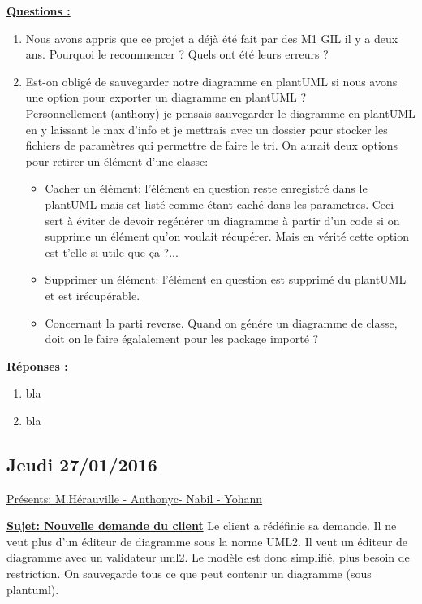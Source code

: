 \documentclass[a4paper,10pt]{article}
\begin{document}
\textbf{\underline{Questions :}}
\begin{enumerate}
  \item Nous avons appris que ce projet a déjà été fait par des M1 GIL il y a deux ans. Pourquoi le recommencer ? Quels ont été leurs erreurs ?
  \item Est-on obligé de sauvegarder notre diagramme en plantUML si nous avons une option pour exporter un diagramme en plantUML ?\\
	Personnellement (anthony) je pensais sauvegarder le diagramme en plantUML en y laissant le max d'info et je mettrais avec un dossier
	pour stocker les fichiers de paramètres qui permettre de faire le tri. On aurait deux options pour retirer un élément d'une classe:
	\begin{itemize}
	  \item Cacher un élément: l'élément en question reste enregistré dans le plantUML mais est listé comme étant caché dans les parametres.
		Ceci sert à éviter de devoir regénérer un diagramme à partir d'un code si on supprime un élément qu'on voulait récupérer.
		Mais en vérité cette option est t'elle si utile que ça ?...
	  \item Supprimer un élément: l'élément en question est supprimé du plantUML et est irécupérable.
	  \item Concernant la parti reverse. Quand on génére un diagramme de classe, doit on le faire égalalement pour les package importé ?
	\end{itemize}
\end{enumerate}

\textbf{\underline{Réponses :}} 
\begin{enumerate}
 \item bla
 \item bla
\end{enumerate}

\subsection{Jeudi 27/01/2016}
\underline{Présents: M.Hérauville - Anthonyc- Nabil - Yohann}

\textbf{\underline{Sujet: Nouvelle demande du client}}
Le client a rédéfinie sa demande. Il ne veut plus d'un éditeur de diagramme sous la norme UML2.
Il veut un éditeur de diagramme avec un validateur uml2.
Le modèle est donc simplifié, plus besoin de restriction. On sauvegarde tous ce que peut contenir un diagramme (sous plantuml).
\end{document}
